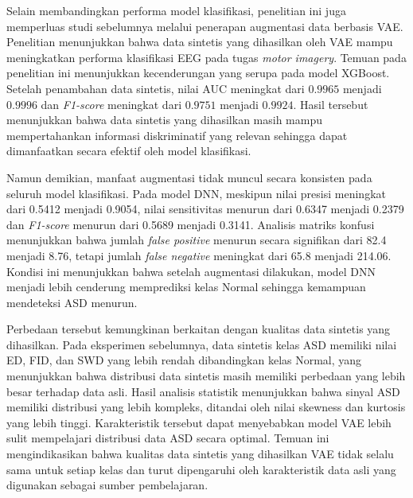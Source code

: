 Selain membandingkan performa model klasifikasi, penelitian ini juga memperluas studi sebelumnya melalui penerapan augmentasi data berbasis VAE. Penelitian \cite{gan_eeg_emotion} menunjukkan bahwa data sintetis yang dihasilkan oleh VAE mampu meningkatkan performa klasifikasi EEG pada tugas \textit{motor imagery}. Temuan pada penelitian ini menunjukkan kecenderungan yang serupa pada model XGBoost. Setelah penambahan data sintetis, nilai AUC meningkat dari $0.9965$ menjadi $0.9996$ dan \textit{F1-score} meningkat dari $0.9751$ menjadi $0.9924$. Hasil tersebut menunjukkan bahwa data sintetis yang dihasilkan masih mampu mempertahankan informasi diskriminatif yang relevan sehingga dapat dimanfaatkan secara efektif oleh model klasifikasi.

Namun demikian, manfaat augmentasi tidak muncul secara konsisten pada seluruh model klasifikasi. Pada model DNN, meskipun nilai presisi meningkat dari 0.5412 menjadi 0.9054, nilai sensitivitas menurun dari 0.6347 menjadi 0.2379 dan \textit{F1-score} menurun dari 0.5689 menjadi 0.3141. Analisis matriks konfusi menunjukkan bahwa jumlah \textit{false positive} menurun secara signifikan dari 82.4 menjadi 8.76, tetapi jumlah \textit{false negative} meningkat dari 65.8 menjadi 214.06. Kondisi ini menunjukkan bahwa setelah augmentasi dilakukan, model DNN menjadi lebih cenderung memprediksi kelas Normal sehingga kemampuan mendeteksi ASD menurun.

Perbedaan tersebut kemungkinan berkaitan dengan kualitas data sintetis yang dihasilkan. Pada eksperimen sebelumnya, data sintetis kelas ASD memiliki nilai ED, FID, dan SWD yang lebih rendah dibandingkan kelas Normal, yang menunjukkan bahwa distribusi data sintetis masih memiliki perbedaan yang lebih besar terhadap data asli. Hasil analisis statistik menunjukkan bahwa sinyal ASD memiliki distribusi yang lebih kompleks, ditandai oleh nilai skewness dan kurtosis yang lebih tinggi. Karakteristik tersebut dapat menyebabkan model VAE lebih sulit mempelajari distribusi data ASD secara optimal. Temuan ini mengindikasikan bahwa kualitas data sintetis yang dihasilkan VAE tidak selalu sama untuk setiap kelas dan turut dipengaruhi oleh karakteristik data asli yang digunakan sebagai sumber pembelajaran.

